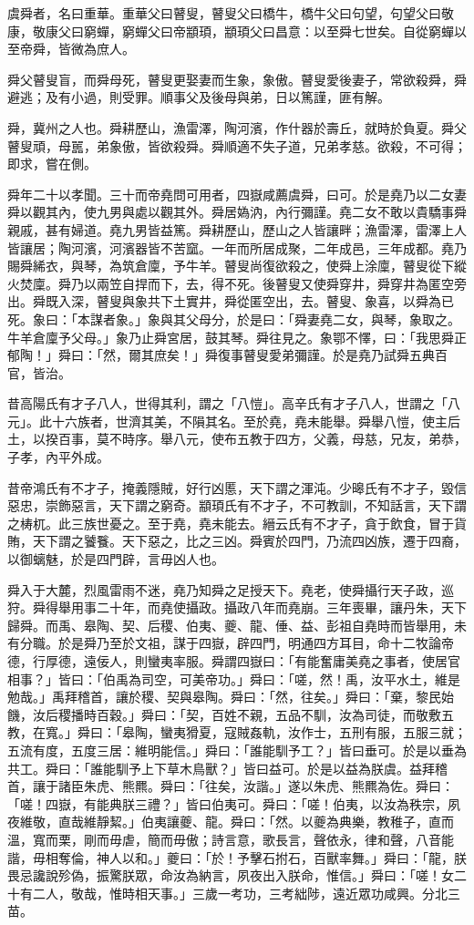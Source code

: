 \begin{pinyinscope}
虞舜者，名曰重華。重華父曰瞽叟，瞽叟父曰橋牛，橋牛父曰句望，句望父曰敬康，敬康父曰窮蟬，窮蟬父曰帝顓頊，顓頊父曰昌意：以至舜七世矣。自從窮蟬以至帝舜，皆微為庶人。

舜父瞽叟盲，而舜母死，瞽叟更娶妻而生象，象傲。瞽叟愛後妻子，常欲殺舜，舜避逃；及有小過，則受罪。順事父及後母與弟，日以篤謹，匪有解。

舜，冀州之人也。舜耕歷山，漁雷澤，陶河濱，作什器於壽丘，就時於負夏。舜父瞽叟頑，母嚚，弟象傲，皆欲殺舜。舜順適不失子道，兄弟孝慈。欲殺，不可得；即求，嘗在側。

舜年二十以孝聞。三十而帝堯問可用者，四嶽咸薦虞舜，曰可。於是堯乃以二女妻舜以觀其內，使九男與處以觀其外。舜居媯汭，內行彌謹。堯二女不敢以貴驕事舜親戚，甚有婦道。堯九男皆益篤。舜耕歷山，歷山之人皆讓畔；漁雷澤，雷澤上人皆讓居；陶河濱，河濱器皆不苦窳。一年而所居成聚，二年成邑，三年成都。堯乃賜舜絺衣，與琴，為筑倉廩，予牛羊。瞽叟尚復欲殺之，使舜上涂廩，瞽叟從下縱火焚廩。舜乃以兩笠自捍而下，去，得不死。後瞽叟又使舜穿井，舜穿井為匿空旁出。舜既入深，瞽叟與象共下土實井，舜從匿空出，去。瞽叟、象喜，以舜為已死。象曰：「本謀者象。」象與其父母分，於是曰：「舜妻堯二女，與琴，象取之。牛羊倉廩予父母。」象乃止舜宮居，鼓其琴。舜往見之。象鄂不懌，曰：「我思舜正郁陶！」舜曰：「然，爾其庶矣！」舜復事瞽叟愛弟彌謹。於是堯乃試舜五典百官，皆治。

昔高陽氏有才子八人，世得其利，謂之「八愷」。高辛氏有才子八人，世謂之「八元」。此十六族者，世濟其美，不隕其名。至於堯，堯未能舉。舜舉八愷，使主后土，以揆百事，莫不時序。舉八元，使布五教于四方，父義，母慈，兄友，弟恭，子孝，內平外成。

昔帝鴻氏有不才子，掩義隱賊，好行凶慝，天下謂之渾沌。少暤氏有不才子，毀信惡忠，崇飾惡言，天下謂之窮奇。顓頊氏有不才子，不可教訓，不知話言，天下謂之梼杌。此三族世憂之。至于堯，堯未能去。縉云氏有不才子，貪于飲食，冒于貨賄，天下謂之饕餮。天下惡之，比之三凶。舜賓於四門，乃流四凶族，遷于四裔，以御螭魅，於是四門辟，言毋凶人也。

舜入于大麓，烈風雷雨不迷，堯乃知舜之足授天下。堯老，使舜攝行天子政，巡狩。舜得舉用事二十年，而堯使攝政。攝政八年而堯崩。三年喪畢，讓丹朱，天下歸舜。而禹、皋陶、契、后稷、伯夷、夔、龍、倕、益、彭祖自堯時而皆舉用，未有分職。於是舜乃至於文祖，謀于四嶽，辟四門，明通四方耳目，命十二牧論帝德，行厚德，遠佞人，則蠻夷率服。舜謂四嶽曰：「有能奮庸美堯之事者，使居官相事？」皆曰：「伯禹為司空，可美帝功。」舜曰：「嗟，然！禹，汝平水土，維是勉哉。」禹拜稽首，讓於稷、契與皋陶。舜曰：「然，往矣。」舜曰：「棄，黎民始饑，汝后稷播時百穀。」舜曰：「契，百姓不親，五品不馴，汝為司徒，而敬敷五教，在寬。」舜曰：「皋陶，蠻夷猾夏，寇賊姦軌，汝作士，五刑有服，五服三就；五流有度，五度三居：維明能信。」舜曰：「誰能馴予工？」皆曰垂可。於是以垂為共工。舜曰：「誰能馴予上下草木鳥獸？」皆曰益可。於是以益為朕虞。益拜稽首，讓于諸臣朱虎、熊羆。舜曰：「往矣，汝諧。」遂以朱虎、熊羆為佐。舜曰：「嗟！四嶽，有能典朕三禮？」皆曰伯夷可。舜曰：「嗟！伯夷，以汝為秩宗，夙夜維敬，直哉維靜絜。」伯夷讓夔、龍。舜曰：「然。以夔為典樂，教稚子，直而溫，寬而栗，剛而毋虐，簡而毋傲；詩言意，歌長言，聲依永，律和聲，八音能諧，毋相奪倫，神人以和。」夔曰：「於！予擊石拊石，百獸率舞。」舜曰：「龍，朕畏忌讒說殄偽，振驚朕眾，命汝為納言，夙夜出入朕命，惟信。」舜曰：「嗟！女二十有二人，敬哉，惟時相天事。」三歲一考功，三考絀陟，遠近眾功咸興。分北三苗。


\end{pinyinscope}
